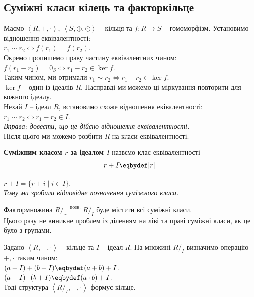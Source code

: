 \documentclass{math_library}
\begin{document}
\subsection{Суміжні класи кілець та факторкільце}
Маємо $\left< R, +, \cdot \right>,\ \left< S, \oplus, \odot \right>$ -- кільця та $f \colon R \to S$ -- гомоморфізм. Установимо відношення еквівалентності:\\
$r_1 \sim r_2 \iff f(r_1) = f(r_2)$.\\
Окремо пропишемо праву частину еквівалентних чином:\\
$f(r_1-r_2) = 0_S \iff r_1 - r_2 \in \ker f$.\\
Таким чином, ми отримали $r_1 \sim r_2 \iff r_1 - r_2 \in \ker f$.\\
$\ker f$ -- один із ідеалів $R$. Насправді ми можемо ці міркування повторити для кожного ідеалу.
\bigskip \\
Нехай $I$ -- ідеал $R$, встановимо схоже відношення еківалентності:\\
$r_1 \sim r_2 \iff r_1 - r_2 \in I$.\\
\textit{Вправа: довести, що це дійсно відношення еквівалентності.}\\
Після цього ми можемо розбити $R$ на класи еквівалентності.

\begin{definition}
\textbf{Суміжним класом $r$ за ідеалом $I$} назвемо клас еквівалентності
\begin{align*}
r+I \eqbydef [r]
\end{align*}
\end{definition}

\begin{proposition}
$r+I = \{ r+i \mid i \in I \}$.\\
\textit{Тому ми зробили відповідне позначення суміжного класа.}
\end{proposition}
Фактормножина $R/_\sim \overset{\text{позн.}}{=} R/_I$ буде містити всі суміжні класи.
\bigskip \\
Цього разу не виникне проблем із діленням на ліві та праві суміжні класи, як це було з групами. 

\begin{theorem}
Задано $\left< R,+,\cdot \right>$ -- кільце та $I$ -- ідеал $R$. На множині $R/_I$ визначимо операцію $+, \cdot$ таким чином:\\
$(a+I) + (b+I) \eqbydef (a+b)+I$.\\
$(a+I) \cdot (b+I) \eqbydef (a \cdot b) + I$.\\
Тоді структура $\left< R/_I, +, \cdot \right>$ формує кільце.
\end{theorem}
\end{document}
